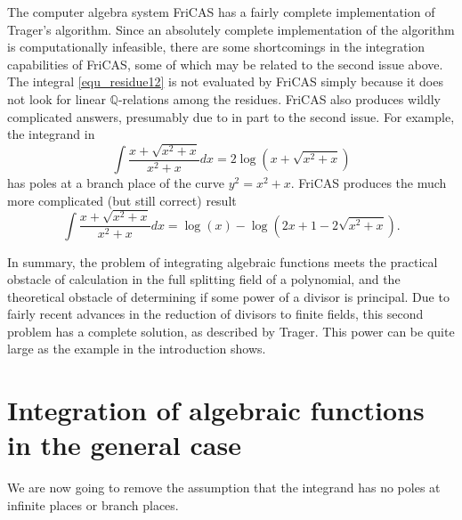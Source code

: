 \documentclass[12pt,reqno]{amsart}
\numberwithin{equation}{section}
\begin{document}
The computer algebra system FriCAS \cite{fricas} has a fairly complete implementation of Trager's algorithm. Since an absolutely complete implementation of the algorithm is computationally infeasible, there are some shortcomings in the integration capabilities of FriCAS, some of which may be related to the second issue above. The integral \eqref{equ_residue12} is not evaluated by FriCAS simply because it does not look for linear $\mathbb{Q}$-relations among the residues. FriCAS also produces wildly complicated answers, presumably due to in part to the second issue. For example, the integrand in
\begin{equation*}
\int \frac{x+\sqrt{x^2+x}}{x^2+x} dx = 2 \log (x+\sqrt{x^2+x})
\end{equation*}
has poles at a branch place of the curve $y^2=x^2+x$. FriCAS produces the much more complicated (but still correct) result
\begin{equation*}
\int \frac{x+\sqrt{x^2+x}}{x^2+x} dx = \log(x) - \log(2 x+1-2 \sqrt{x^2+x})\text{.}
\end{equation*}


In summary, the problem of integrating algebraic functions meets the practical obstacle of calculation in the full splitting field of a polynomial, and the theoretical obstacle of determining if some power of a divisor is principal. Due to fairly recent advances in the reduction of divisors to finite fields, this second problem has a complete solution, as described by Trager. This power can be quite large as the example in the introduction shows.
 


\section{Integration of algebraic functions in the general case}
\label{section_infinite}
We are now going to remove the assumption that the integrand has no poles at infinite places or branch places.
\end{document}
